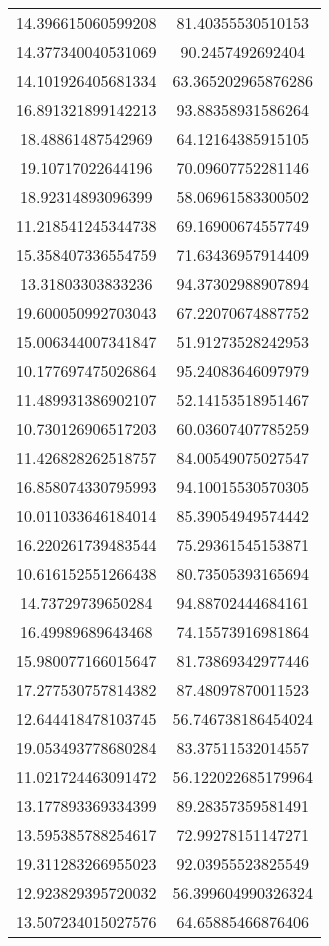 \begin{table}
\begin{tabular}{cc}
14.396615060599208 & 81.40355530510153 \\
14.377340040531069 & 90.2457492692404 \\
14.101926405681334 & 63.365202965876286 \\
16.891321899142213 & 93.88358931586264 \\
18.48861487542969 & 64.12164385915105 \\
19.10717022644196 & 70.09607752281146 \\
18.92314893096399 & 58.06961583300502 \\
11.218541245344738 & 69.16900674557749 \\
15.358407336554759 & 71.63436957914409 \\
13.31803303833236 & 94.37302988907894 \\
19.600050992703043 & 67.22070674887752 \\
15.006344007341847 & 51.91273528242953 \\
10.177697475026864 & 95.24083646097979 \\
11.489931386902107 & 52.14153518951467 \\
10.730126906517203 & 60.03607407785259 \\
11.426828262518757 & 84.00549075027547 \\
16.858074330795993 & 94.10015530570305 \\
10.011033646184014 & 85.39054949574442 \\
16.220261739483544 & 75.29361545153871 \\
10.616152551266438 & 80.73505393165694 \\
14.73729739650284 & 94.88702444684161 \\
16.49989689643468 & 74.15573916981864 \\
15.980077166015647 & 81.73869342977446 \\
17.277530757814382 & 87.48097870011523 \\
12.644418478103745 & 56.746738186454024 \\
19.053493778680284 & 83.37511532014557 \\
11.021724463091472 & 56.122022685179964 \\
13.177893369334399 & 89.28357359581491 \\
13.595385788254617 & 72.99278151147271 \\
19.311283266955023 & 92.03955523825549 \\
12.923829395720032 & 56.399604990326324 \\
13.507234015027576 & 64.65885466876406 \\

\end{tabular}
\end{table}
